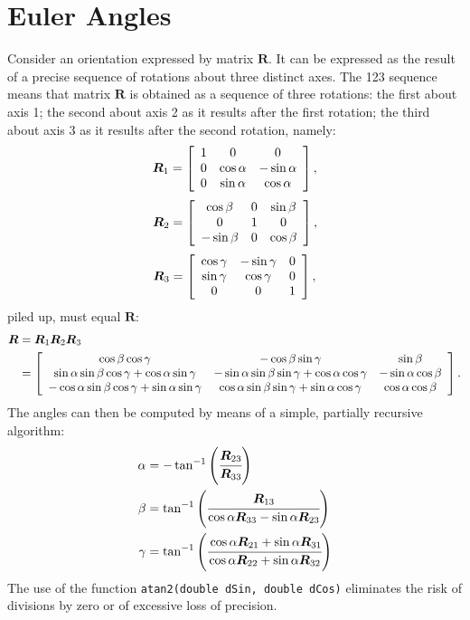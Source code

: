 \documentclass[10pt,dvips,fleqn,subeqn]{report}
\newcommand{\T}[1]{\bm{#1}}
\begin{document}
\section{Euler Angles}
Consider an orientation expressed by matrix $\T{R}$.
It can be expressed as the result of a precise sequence of rotations 
about three distinct axes.
The 123 sequence means that matrix $\T{R}$ is obtained as a sequence
of three rotations: the first about axis 1; the second about axis 2
as it results after the first rotation; the third about axis 3
as it results after the second rotation, namely:
\begin{equation}
	\T{R}_1 = \sqbr{\matr{ccc}{
		1 & 0 & 0 \\
		0 & \cos\alpha & -\sin\alpha \\
		0 & \sin\alpha & \cos\alpha
	}} ,
\end{equation}
\begin{equation}
	\T{R}_2 = \sqbr{\matr{ccc}{
		\cos\beta & 0 & \sin\beta \\
		0 & 1 & 0 \\
		-\sin\beta & 0 & \cos\beta
	}} ,
\end{equation}
\begin{equation}
	\T{R}_3 = \sqbr{\matr{ccc}{
		\cos\gamma & -\sin\gamma & 0 \\
		\sin\gamma & \cos\gamma & 0 \\
		0 & 0 & 1
	}} ,
\end{equation}
piled up, must equal $\T{R}$:
\begin{align}
	\T{R} &= \T{R}_1 \T{R}_2 \T{R}_3 \\
	&= \sqbr{\matr{ccc}{
		\cos\beta \cos\gamma
		& -\cos\beta \sin\gamma
		& \sin\beta \\
		\sin\alpha \sin\beta \cos\gamma + \cos\alpha \sin\gamma
		& -\sin\alpha \sin\beta \sin\gamma + \cos\alpha \cos\gamma
		& -\sin\alpha \cos\beta \\
		-\cos\alpha \sin\beta \cos\gamma + \sin\alpha \sin\gamma
		& \cos\alpha \sin\beta \sin\gamma + \sin\alpha \cos\gamma
		& \cos\alpha \cos\beta
	}} \nonumber .
\end{align}
The angles can then be computed by means of a simple, 
partially recursive algorithm:
\begin{align}
	\alpha &= - \tan^{-1}\plbr{\cfrac{\T{R}_{23}}{\T{R}_{33}}} \\
	\beta &= \tan^{-1}\plbr{\cfrac{\T{R}_{13}}{
			\cos\alpha \T{R}_{33} - \sin\alpha \T{R}_{23}
		}} \\
	\gamma &= \tan^{-1}\plbr{\cfrac{
		\cos\alpha \T{R}_{21} + \sin\alpha \T{R}_{31}
	}{
		\cos\alpha \T{R}_{22} + \sin\alpha \T{R}_{32}
	}}
\end{align}
The use of the function \texttt{atan2(double dSin, double dCos)}
eliminates the risk of divisions by zero or of excessive loss of precision.
\end{document}
